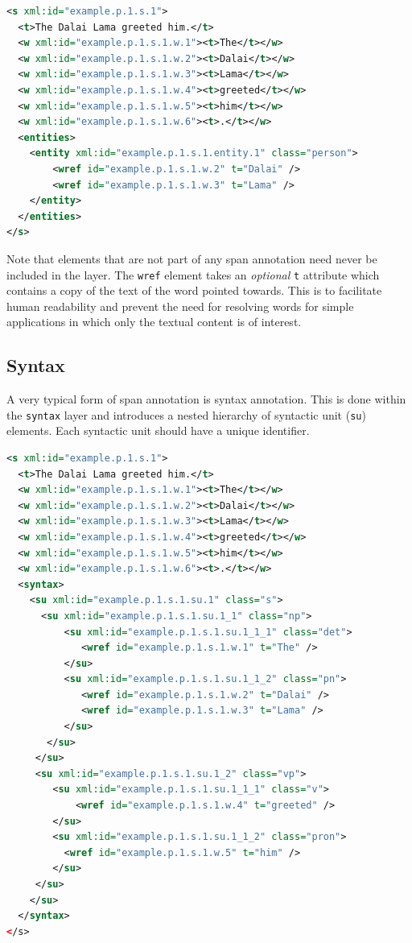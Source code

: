 \documentclass[a4paper,12pt]{report}
\begin{document}
\begin{lstlisting}[language=xml]
<s xml:id="example.p.1.s.1">
  <t>The Dalai Lama greeted him.</t>
  <w xml:id="example.p.1.s.1.w.1"><t>The</t></w>
  <w xml:id="example.p.1.s.1.w.2"><t>Dalai</t></w>
  <w xml:id="example.p.1.s.1.w.3"><t>Lama</t></w>
  <w xml:id="example.p.1.s.1.w.4"><t>greeted</t></w>
  <w xml:id="example.p.1.s.1.w.5"><t>him</t></w>
  <w xml:id="example.p.1.s.1.w.6"><t>.</t></w>
  <entities>
    <entity xml:id="example.p.1.s.1.entity.1" class="person">
        <wref id="example.p.1.s.1.w.2" t="Dalai" />
        <wref id="example.p.1.s.1.w.3" t="Lama" />
    </entity>
  </entities>
</s>
\end{lstlisting}

Note that elements that are not part of any span annotation need never be included in the layer. The \texttt{wref} element takes an \emph{optional} \texttt{t} attribute which contains a copy of the text of the word pointed towards. This is to facilitate human readability and prevent the need for resolving words for simple applications in which only the textual content is of interest.

\subsection{Syntax}

A very typical form of span annotation is syntax annotation. This is done within the \texttt{syntax} layer and introduces a nested hierarchy of syntactic unit (\texttt{su}) elements. Each syntactic unit should have a unique identifier.

\begin{lstlisting}[language=xml]
<s xml:id="example.p.1.s.1">
  <t>The Dalai Lama greeted him.</t>
  <w xml:id="example.p.1.s.1.w.1"><t>The</t></w>
  <w xml:id="example.p.1.s.1.w.2"><t>Dalai</t></w>
  <w xml:id="example.p.1.s.1.w.3"><t>Lama</t></w>
  <w xml:id="example.p.1.s.1.w.4"><t>greeted</t></w>
  <w xml:id="example.p.1.s.1.w.5"><t>him</t></w>
  <w xml:id="example.p.1.s.1.w.6"><t>.</t></w>
  <syntax>
    <su xml:id="example.p.1.s.1.su.1" class="s">     
      <su xml:id="example.p.1.s.1.su.1_1" class="np">
          <su xml:id="example.p.1.s.1.su.1_1_1" class="det">
             <wref id="example.p.1.s.1.w.1" t="The" />       
          </su>
          <su xml:id="example.p.1.s.1.su.1_1_2" class="pn">
             <wref id="example.p.1.s.1.w.2" t="Dalai" />
             <wref id="example.p.1.s.1.w.3" t="Lama" />        
          </su>         
       </su>
     </su>
     <su xml:id="example.p.1.s.1.su.1_2" class="vp"> 
        <su xml:id="example.p.1.s.1.su.1_1_1" class="v">
            <wref id="example.p.1.s.1.w.4" t="greeted" />       
        </su>
        <su xml:id="example.p.1.s.1.su.1_1_2" class="pron">
          <wref id="example.p.1.s.1.w.5" t="him" />       
        </su>
     </su>    
    </su>
  </syntax>
</s>
\end{lstlisting}
\end{document}
